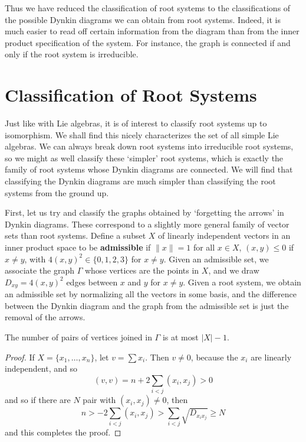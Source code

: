 Thus we have reduced the classification of root systems to the classifications of the possible Dynkin diagrams we can obtain from root systems. Indeed, it is much easier to read off certain information from the diagram than from the inner product specification of the system. For instance, the graph is connected if and only if the root system is irreducible.

\section{Classification of Root Systems}

Just like with Lie algebras, it is of interest to classify root systems up to isomorphism. We shall find this nicely characterizes the set of all simple Lie algebras. We can always break down root systems into irreducible root systems, so we might as well classify these `simpler' root systems, which is exactly the family of root systems whose Dynkin diagrams are connected. We will find that classifying the Dynkin diagrams are much simpler than classifying the root systems from the ground up.

First, let us try and classify the graphs obtained by `forgetting the arrows' in Dynkin diagrams. These correspond to a slightly more general family of vector sets than root systems. Define a subset $X$ of linearly independent vectors in an inner product space to be {\bf admissible} if $\| x \| = 1$ for all $x \in X$, $(x,y) \leq 0$ if $x \neq y$, with $4(x,y)^2 \in \{ 0, 1, 2, 3 \}$ for $x \neq y$. Given an admissible set, we associate the graph $\Gamma$ whose vertices are the points in $X$, and we draw $D_{xy} = 4(x,y)^2$ edges between $x$ and $y$ for $x \neq y$. Given a root system, we obtain an admissible set by normalizing all the vectors in some basis, and the difference between the Dynkin diagram and the graph from the admissible set is just the removal of the arrows.

\begin{lemma}
    The number of pairs of vertices joined in $\Gamma$ is at most $|X| - 1$.
\end{lemma}
\begin{proof}
    If $X = \{ x_1, \dots, x_n \}$, let $v = \sum x_i$. Then $v \neq 0$, because the $x_i$ are linearly independent, and so
    \[ (v,v) = n + 2 \sum_{i < j} (x_i,x_j) > 0 \]
    and so if there are $N$ pair with $(x_i, x_j) \neq 0$, then
    \[ n > - 2 \sum_{i < j} (x_i, x_j) > \sum_{i < j} \sqrt{D_{x_ix_j}} \geq N \]
    and this completes the proof.
\end{proof}

